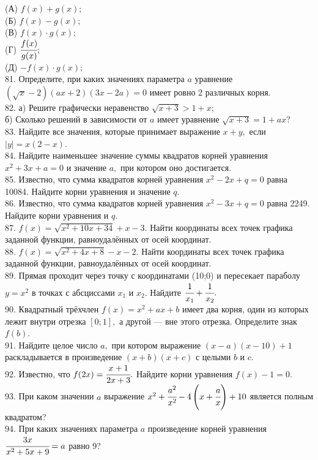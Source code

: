 \documentclass[12pt]{article}
\begin{document}
(А) $f(x)+g(x);$\\
(Б) $f(x)-g(x);$\\
(В) $f(x)\cdot g(x);$\\
(Г) $\cfrac{f(x)}{g(x)};$\\
(Д) $-f(x)\cdot g(x);$\\
81. Определите, при каких значениях параметра $a$ уравнение $(\sqrt{x}-2)(ax+2)(3x-2a)=0$ имеет ровно 2 различных корня.\\
82. а) Решите графически неравенство $\sqrt{x+3}>1+x;$\\
б) Сколько решений в зависимости от  $a$ имеет уравнение $\sqrt{x+3}=1+ax?$\\
83. Найдите все значения, которые принимает выражение $x+y,$ если $|y|=x(2-x).$\\
84. Найдите наименьшее значение суммы квадратов корней уравнения $x^2+3x+a=0$ и значение $a,$ при котором оно достигается.\\
85. Известно, что сумма квадратов корней уравнения $x^2-2x + q = 0$ равна 10084.
Найдите корни уравнения и значение $q.$\\
86. Известно, что сумма квадратов корней уравнения $x^2 -3x + q = 0$ равна 2249.
Найдите корни уравнения и $q.$\\
87. $f(x)=\sqrt{x^2+10x+34}+x-3.$ Найти координаты всех точек графика заданной функции,
равноудалённых от осей координат.\\
88. $f(x)=\sqrt{x^2+4x+8}-x-2.$ Найти координаты всех точек графика заданной функции,
равноудалённых от осей координат.\\
89. Прямая проходит через точку с координатами (10;0) и пересекает параболу $y=x^2$ в точках с абсциссами $x_1$ и $x_2.$ Найдите $\cfrac{1}{x_1}+\cfrac{1}{x_2}.$\\
90. Квадратный трёхчлен $f(x)=x^2+ax+b$ имеет два корня, один из которых лежит внутри отрезка  $[0;1],$ а
другой --- вне этого отрезка. Определите знак $f(b).$\\
91. Найдите целое число  $a,$ при котором выражение  $(x-a)(x-10)+1$ раскладывается в произведение $(x+b)(x+c)$ с целыми  $b$ и  $c.$\\
92. Известно, что $f(2x)=\cfrac{x+1}{2x+3}.$ Найдите корни уравнения $f(x)-1=0.$\\
93. При каком значении $a$ выражение $x^2+\cfrac{a^2}{x^2}-4\left(x+\cfrac{a}{x}\right)+10$ является полным квадратом?\\
94. При каких значениях параметра $a$ произведение корней уравнения $\cfrac{3x}{x^2+5x+9}=a$ равно 9?
\newpage
\end{document}
